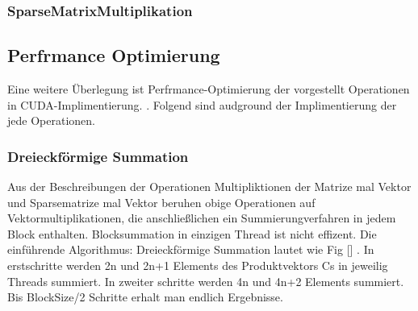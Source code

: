 \begin{firuge}[htbp]
\subsubsection{SparseMatrixMultiplikation}


\subsection{Perfrmance Optimierung}
Eine weitere Überlegung ist Perfrmance-Optimierung der vorgestellt Operationen in CUDA-Implimentierung. .
Folgend sind audground der Implimentierung der jede Operationen.


\subsubsection{Dreieckförmige Summation}
Aus der Beschreibungen der Operationen Multipliktionen der Matrize mal Vektor und Sparsematrize  mal Vektor beruhen obige Operationen auf Vektormultiplikationen, die anschließlichen ein Summierungverfahren in jedem Block enthalten. Blocksummation in einzigen Thread ist nicht effizent. Die einführende Algorithmus: Dreieckförmige Summation lautet wie Fig [] . In erstschritte werden 2n und 2n+1 Elements des Produktvektors Cs in jeweilig Threads summiert. In zweiter schritte werden 4n und 4n+2 Elements summiert. Bis BlockSize/2 Schritte erhalt man endlich Ergebnisse.


\end{firuge}
